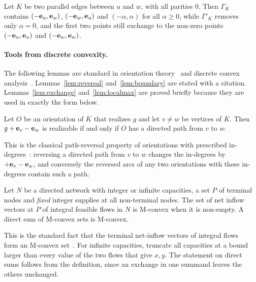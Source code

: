 \begin{example}\label{ex:digon}
Let $K$ be two parallel edges between $u$ and $w$, with all parities $0$. Then $\Gamma_K$ contains $(-\mathbf{e}_u,\mathbf{e}_w)$, $(-\mathbf{e}_w,\mathbf{e}_u)$ and $(-\alpha,\alpha)$ for all $\alpha\ge0$, while $\Gamma'_K$ removes only $\alpha=0$, and the first two points still exchange to the non-zero points $(-\mathbf{e}_u,\mathbf{e}_u)$ and $(-\mathbf{e}_w,\mathbf{e}_w)$.
\end{example}

\paragraph{Tools from discrete convexity.}
The following lemmas are standard in orientation theory~\cite{hakimi1965,frank1980,frank2011} and discrete convex analysis~\cite{murota2003,fujishige2005}. Lemmas~\ref{lem:reversal} and~\ref{lem:boundary} are stated with a citation. Lemmas~\ref{lem:exchange} and~\ref{lem:localmax} are proved briefly because they are used in exactly the form below.

\begin{lemma}\label{lem:reversal}
Let $O$ be an orientation of $K$ that realizes $g$ and let $v\ne w$ be vertices of $K$. Then $g+\mathbf{e}_v-\mathbf{e}_w$ is realizable if and only if $O$ has a directed path from $v$ to $w$.
\end{lemma}

This is the classical path-reversal property of orientations with prescribed in-degrees~\cite{hakimi1965,frank1980,frank2011}: reversing a directed path from $v$ to $w$ changes the in-degrees by $+\mathbf{e}_v-\mathbf{e}_w$, and conversely the reversed arcs of any two orientations with these in-degrees contain such a path.

\begin{lemma}\label{lem:boundary}
Let $N$ be a directed network with integer or infinite capacities, a set $P$ of terminal nodes and \emph{fixed} integer supplies at all non-terminal nodes. The set of net inflow vectors at $P$ of integral feasible flows in $N$ is M-convex when it is non-empty. A direct sum of M-convex sets is M-convex.
\end{lemma}

This is the standard fact that the terminal net-inflow vectors of integral flows form an M-convex set~\cite{murota2003,fujishige2005}. For infinite capacities, truncate all capacities at a bound larger than every value of the two flows that give $x,y$. The statement on direct sums follows from the definition, since an exchange in one summand leaves the others unchanged.

